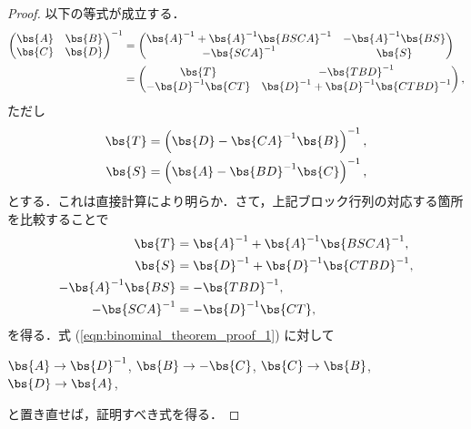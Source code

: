 \begin{proof}
以下の等式が成立する．
\begin{align*}
    \begin{pmatrix}
        \bs{A} & \bs{B} \\
        \bs{C} & \bs{D}
    \end{pmatrix}^{-1}
    &= \begin{pmatrix}
        \bs{A}^{-1} + \bs{A}^{-1}\bs{BSCA}^{-1} & - \bs{A}^{-1}\bs{BS} \\
        - \bs{SCA}^{-1}                         & \bs{S}
    \end{pmatrix} \\
    &= \begin{pmatrix}
        \bs{T}                & - \bs{TBD}^{-1} \\
        - \bs{D}^{-1} \bs{CT} & \bs{D}^{-1} + \bs{D}^{-1} \bs{CTBD}^{-1}
    \end{pmatrix},
\end{align*}
ただし
\begin{align}
    \bs{T} &= \left( \bs{D} - \bs{CA}^{-1} \bs{B} \right)^{-1}, \\
    \bs{S} &= \left( \bs{A} - \bs{BD}^{-1} \bs{C} \right)^{-1},
\end{align}
とする．これは直接計算により明らか．さて，上記ブロック行列の対応する箇所を比較することで
\begin{align}
    \bs{T} &= \bs{A}^{-1} + \bs{A}^{-1}\bs{BSCA}^{-1},
    \label{eqn:binominal_theorem_proof_1} \\
    \bs{S} &= \bs{D}^{-1} + \bs{D}^{-1} \bs{CTBD}^{-1}, \\
    - \bs{A}^{-1} \bs{BS} &= - \bs{TBD}^{-1}, \\
    - \bs{SCA}^{-1} &= - \bs{D}^{-1} \bs{CT},
\end{align}
を得る．式 (\ref{eqn:binominal_theorem_proof_1}) に対して
\begin{center}
    $\bs{A} \to \bs{D}^{-1}$, \hspace{5pt}
    $\bs{B} \to - \bs{C}$, \hspace{5pt}
    $\bs{C} \to \bs{B}$, \hspace{5pt}
    $\bs{D} \to \bs{A}$,
\end{center}
と置き直せば，証明すべき式を得る．
\end{proof}


